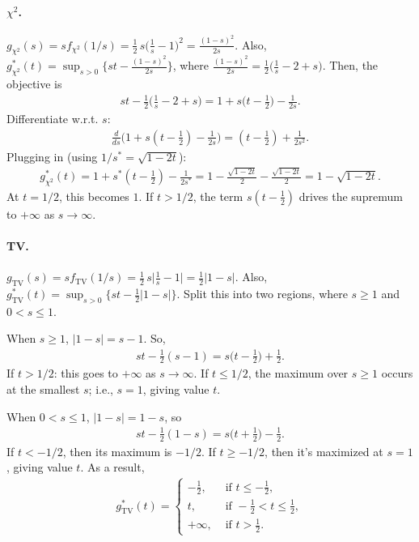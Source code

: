 \paragraph{$\chi^2$.} $g_{\chi^2}(s)=s f_{\chi^2}(1/s) =\frac12\,s\Big(\frac1s-1\Big)^2 =\frac{(1-s)^2}{2s}$. Also, $g^*_{\chi^2}(t)=\sup_{s > 0}\Big\{st-\frac{(1-s)^2}{2s}\Big\}$, where $\frac{(1-s)^2}{2s}=\frac12\Big(\frac1s-2+s\Big)$. Then, the objective is 
\begin{align}
    st-\frac12\Big(\frac1s-2+s\Big) =1+s\Big(t-\tfrac12\Big)-\frac{1}{2s}.
\end{align}
Differentiate w.r.t. $s$: 
\begin{align}
    \frac{d}{ds}\Big(1+s(t-\tfrac12)-\frac{1}{2s}\Big) =(t-\tfrac12)+\frac{1}{2s^2}.
\end{align}
Plugging in (using $1/s^*=\sqrt{1-2t}$): 
\begin{align}
    g^*_{\chi^2}(t) =1+s^*(t-\tfrac12)-\frac{1}{2s^*} =1-\frac{\sqrt{1-2t}}{2}-\frac{\sqrt{1-2t}}{2} =1-\sqrt{1-2t}.
\end{align}
At $t = 1/2$, this becomes $1$. If $t > 1/2$, the term $s(t-\tfrac12)$ drives the supremum to $+\infty$ as $s \rightarrow \infty$. 

\paragraph{TV.} $g_{\mathrm{TV}}(s)=s f_{\mathrm{TV}}(1/s) =\frac12\,s\Big|\frac1s-1\Big| =\frac12|1-s|$. Also, $g_{\mathrm{TV}}^*(t)=\sup_{s > 0}\Big\{st-\tfrac12|1-s|\Big\}$. Split this into two regions, where $s \geq 1$ and $0 < s \leq 1$. 

When $s \geq 1$, $|1-s| = s-1$. So, 
\begin{align}
    st-\tfrac12(s-1)=s\Big(t-\tfrac12\Big)+\tfrac12.
\end{align}
If $t > 1/2$: this goes to $+\infty$ as $s \rightarrow \infty$. If $t \leq 1/2$, the maximum over $s \geq 1$ occurs at the smallest $s$; i.e., $s=1$, giving value $t$. 

When $0 < s \leq 1$, $|1-s| = 1-s$, so 
\begin{align}
    st-\tfrac12(1-s)=s\Big(t+\tfrac12\Big)-\tfrac12.
\end{align}
If $t < -1/2$, then its maximum is $-1/2$. If $t \geq -1/2$, then it's maximized at $s=1$, giving value $t$. As a result, 
\begin{align}
    g_{\mathrm{TV}}^*(t)=
\begin{cases}
-\tfrac12, &\text{ if } t\le -\tfrac12,\\
t, &\text{ if } -\tfrac12 < t \leq \tfrac12,\\
+\infty, &\text{ if } t> \tfrac12.
\end{cases}
\end{align}

